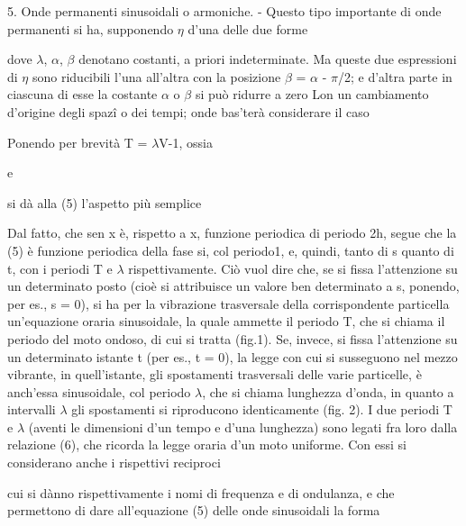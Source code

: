 \documentclass[a4paper]{article}
\begin{document}
5. Onde permanenti sinusoidali o armoniche. - Questo tipo importante di onde permanenti si ha, supponendo $\eta$ d'una delle due forme

dove $\lambda$, $\alpha$, $\beta$ denotano costanti, a priori indeterminate. Ma queste due espressioni di $\eta$ sono riducibili l'una all'altra con la posizione $\beta$ = $\alpha$ - $\pi$/2; e d'altra parte in ciascuna di esse la costante $\alpha$ o $\beta$ si può ridurre a zero Lon un cambiamento d'origine degli spazî o dei tempi; onde bas'terà considerare il caso

Ponendo per brevità T = $\lambda$V-1, ossia

e

si dà alla (5) l'aspetto più semplice

Dal fatto, che sen x è, rispetto a x, funzione periodica di periodo 2h, segue che la (5) è funzione periodica della fase si, col periodo1, e, quindi, tanto di s quanto di t, con i periodi T e $\lambda$ rispettivamente. Ciò vuol dire che, se si fissa l'attenzione su un determinato posto (cioè si attribuisce un valore ben determinato a s, ponendo, per es., s = 0), si ha per la vibrazione trasversale della corrispondente particella un'equazione oraria sinusoidale, la quale ammette il periodo T, che si chiama il periodo del moto ondoso, di cui si tratta (fig.1). Se, invece, si fissa l'attenzione su un determinato istante t (per es., t = 0), la legge con cui si susseguono nel mezzo vibrante, in quell'istante, gli spostamenti trasversali delle varie particelle, è anch'essa sinusoidale, col periodo $\lambda$, che si chiama lunghezza d'onda, in quanto a intervalli $\lambda$ gli spostamenti si riproducono identicamente (fig. 2). I due periodi T e $\lambda$ (aventi le dimensioni d'un tempo e d'una lunghezza) sono legati fra loro dalla relazione (6), che ricorda la legge oraria d'un moto uniforme. Con essi si considerano anche i rispettivi reciproci

cui si dànno rispettivamente i nomi di frequenza e di ondulanza, e che permettono di dare all'equazione (5) delle onde sinusoidali la forma
\end{document}
